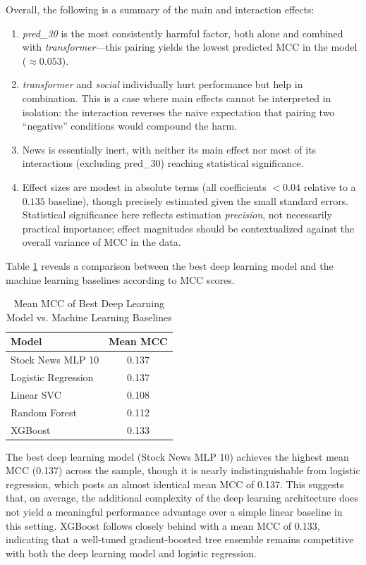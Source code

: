 \documentclass[stu,floatsintext]{apa7}
\begin{document}
Overall, the following is a summary of the main and interaction effects:

\begin{enumerate}
    \item \textit{pred\_30} is the most consistently harmful factor, both alone and combined with \textit{transformer}---this pairing yields the lowest predicted MCC in the model ($\approx 0.053$).
    \item \textit{transformer} and \textit{social} individually hurt performance but help in combination. This is a case where main effects cannot be interpreted in isolation: the interaction reverses the naive expectation that pairing two ``negative'' conditions would compound the harm.
    \item News is essentially inert, with neither its main effect nor most of its interactions (excluding pred\_30) reaching statistical significance.
    \item Effect sizes are modest in absolute terms (all coefficients $< 0.04$ relative to a $0.135$ baseline), though precisely estimated given the small standard errors. Statistical significance here reflects estimation \textit{precision}, not necessarily practical importance; effect magnitudes should be contextualized against the overall variance of MCC in the data.
\end{enumerate}

Table \ref{tab:model_comparison_mean} reveals a comparison between the best deep learning model and the machine learning baselines according to MCC scores.

\begin{table}[htbp]
\centering
\caption{Mean MCC of Best Deep Learning Model vs. Machine Learning Baselines}
\label{tab:model_comparison_mean}
\begin{tabular}{lc}
\toprule
Model & Mean MCC \\
\midrule
Stock News MLP 10        & 0.137 \\
Logistic Regression   & 0.137 \\
Linear SVC            & 0.108 \\
Random Forest          & 0.112 \\
XGBoost                & 0.133 \\
\bottomrule
\end{tabular}
\end{table}
\medskip
\medskip

The best deep learning model (Stock News MLP 10) achieves the highest mean MCC (0.137) across the sample, though it is nearly indistinguishable from logistic regression, which posts an almost identical mean MCC of 0.137. This suggests that, on average, the additional complexity of the deep learning architecture does not yield a meaningful performance advantage over a simple linear baseline in this setting. XGBoost follows closely behind with a mean MCC of 0.133, indicating that a well-tuned gradient-boosted tree ensemble remains competitive with both the deep learning model and logistic regression.
\end{document}
